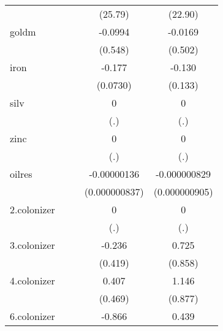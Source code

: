 {\begin{tabular}{l*{4}{c}}
            &                     &                     &     (25.79)         &     (22.90)         \\
[1em]
goldm       &                     &                     &     -0.0994         &     -0.0169         \\
            &                     &                     &     (0.548)         &     (0.502)         \\
[1em]
iron        &                     &                     &      -0.177\sym{*}  &      -0.130         \\
            &                     &                     &    (0.0730)         &     (0.133)         \\
[1em]
silv        &                     &                     &           0         &           0         \\
            &                     &                     &         (.)         &         (.)         \\
[1em]
zinc        &                     &                     &           0         &           0         \\
            &                     &                     &         (.)         &         (.)         \\
[1em]
oilres      &                     &                     & -0.00000136         &-0.000000829         \\
            &                     &                     &(0.000000837)         &(0.000000905)         \\
[1em]
2.colonizer &                     &                     &           0         &           0         \\
            &                     &                     &         (.)         &         (.)         \\
[1em]
3.colonizer &                     &                     &      -0.236         &       0.725         \\
            &                     &                     &     (0.419)         &     (0.858)         \\
[1em]
4.colonizer &                     &                     &       0.407         &       1.146         \\
            &                     &                     &     (0.469)         &     (0.877)         \\
[1em]
6.colonizer &                     &                     &      -0.866\sym{***}&       0.439         \\

\end{tabular}}
